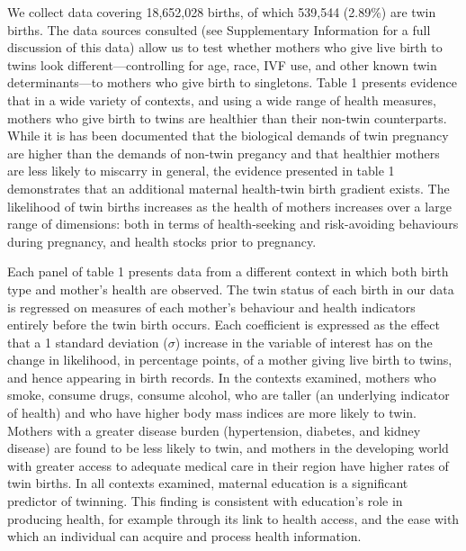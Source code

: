 \documentclass{nature}
\begin{document}
\begin{linenumbers}
%



We collect data covering 18,652,028 births, of which 539,544 (2.89\%) are twin births.  %
The data sources consulted (see Supplementary Information for a full discussion of this data) allow us to test whether mothers who give live birth to twins look different---controlling for age, race, IVF use, and other known twin determinants\cite{Hoekstraetal2008}---to mothers who give birth to singletons.  Table 1 presents evidence that in a wide variety of contexts, and using a wide range of health measures, mothers who give birth to twins are healthier than their non-twin counterparts.  While it is has been documented that the biological demands of twin pregnancy are higher than the demands of non-twin pregancy\cite{Shinagawaetal2005,Kahnetal2003} and that healthier mothers are less likely to miscarry in general\cite{Frettsetal1995,Garciaetal2002}, the evidence presented in table 1 demonstrates that an additional maternal health-twin birth gradient exists. The likelihood of twin births increases as the health of mothers increases over a large range of dimensions: both in terms of health-seeking and risk-avoiding behaviours during pregnancy, and health stocks prior to pregnancy.

Each panel of table 1 presents data from a different context in which both birth type and mother's health are observed.  The twin status of each birth in our data is regressed on measures of each mother's behaviour and health indicators entirely before the twin birth occurs.  Each coefficient is expressed as the effect that a 1 standard deviation ($\sigma$) increase in the variable of interest has on the change in likelihood, in percentage points, of a mother giving live birth to twins, and hence appearing in birth records.  In the contexts examined, mothers who smoke, consume drugs, consume alcohol, who are taller (an underlying indicator of health\cite{Silventoinen2003,BhalotraRawlings2013}) and who have higher body mass indices are more likely to twin.  Mothers with a greater disease burden (hypertension, diabetes, and kidney disease) are found to be less likely to twin, and mothers in the developing world with greater access to adequate medical care in their region have higher rates of twin births.  In all contexts examined, maternal education is a significant predictor of twinning.  This finding is consistent with education's role in producing health, for example through its link to health access, and the ease with which an individual can acquire and process health information.\cite{Kenkel1991,CutlerLlerasMuney2010}


\end{linenumbers}
\end{document}
